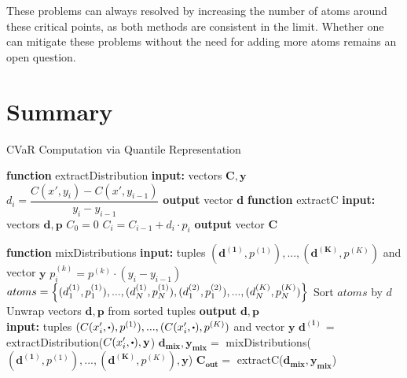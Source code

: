 These problems can always resolved by increasing the number of atoms around these critical points, as both methods are consistent in the limit. Whether one can mitigate these problems without the need for adding more atoms remains an open question.


\section{Summary}


\begin{algorithm}
\caption{CVaR Computation via Quantile Representation}
\begin{algorithmic}\label{alg:cvarvi}
\setlength{\columnseprule}{0.4pt}
\begin{multicols}{2}
\STATE \textbf{function} extractDistribution
\bindent
    \STATE \textbf{input:} vectors $\mathbf{C}, \mathbf{y}$
    \STATE {}
	\STATE $d_i = \dfrac{C(x', y_i)-C(x', y_{i-1})}{y_i-y_{i-1}}$
	\ENDFOR
	\STATE \textbf{output} vector $\mathbf{d}$
\eindent
\STATE \textbf{function} extractC
\bindent
    \STATE \textbf{input:} vectors $\mathbf{d}, \mathbf{p}$
    \STATE $C_0 = 0$
	\STATE $C_i = C_{i-1} + d_i \cdot p_i$
	\ENDFOR
	\STATE \textbf{output} vector $\mathbf{C}$
\eindent
\end{multicols}

\hrulefill

\STATE \textbf{function} mixDistributions
\bindent
    \STATE \textbf{input:} tuples $(\mathbf{d^{(1)}}, p^{(1)}),...,(\mathbf{d^{(K)}}, p^{(K)})$ and vector $\mathbf{y}$ 
    \STATE {}
    	\STATE {}
		\STATE $p^{(k)}_i = p^{(k)} \cdot (y_i - y_{i-1})$
	\ENDFOR
	\STATE {}
	\STATE $atoms = \left\{ {(d^{(1)}_1, p^{(1)}_1), ..., (d^{(1)}_N, p^{(1)}_N), (d^{(2)}_1, p^{(2)}_1), ..., (d^{(K)}_N, p^{(K)}_N)} \right\}$
	\STATE Sort $atoms$ by $d$
	\STATE Unwrap vectors $\mathbf{d}, \mathbf{p}$ from sorted tuples
	\STATE \textbf{output} $\mathbf{d}, \mathbf{p}$
\eindent
\\\hrulefill
\STATE {}
\STATE \textbf{input:} tuples $(C(x_i', \bigcdot), p^{(1)}),...,(C(x_i', \bigcdot), p^{(K)})$ and vector $\mathbf{y}$ 
\STATE $\mathbf{d^{(i)}}$ = extractDistribution($C(x_i', \bigcdot), \mathbf{y}$)
\ENDFOR
\STATE $\mathbf{d_{mix}}, \mathbf{y_{mix}} =$ mixDistributions($(\mathbf{d^{(1)}}, p^{(1)}),...,(\mathbf{d^{(K)}}, p^{(K)}), \mathbf{y}$)
\STATE $\mathbf{C_{out}} =$ extractC($\mathbf{d_{mix}}, \mathbf{y_{mix}}$)
\end{algorithmic}

\end{algorithm}




